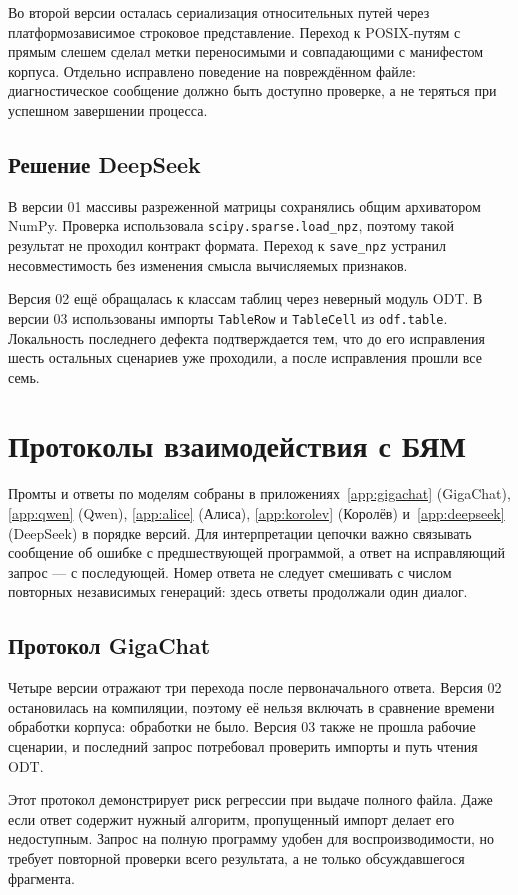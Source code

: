 Во второй версии осталась сериализация относительных путей через платформозависимое строковое представление. Переход к POSIX-путям с прямым слешем сделал метки переносимыми и совпадающими с манифестом корпуса. Отдельно исправлено поведение на повреждённом файле: диагностическое сообщение должно быть доступно проверке, а не теряться при успешном завершении процесса.

\subsection{Решение DeepSeek}
В версии 01 массивы разреженной матрицы сохранялись общим архиватором NumPy. Проверка использовала \texttt{scipy.sparse.load\_npz}, поэтому такой результат не проходил контракт формата. Переход к \texttt{save\_npz} устранил несовместимость без изменения смысла вычисляемых признаков.

Версия 02 ещё обращалась к классам таблиц через неверный модуль ODT. В версии 03 использованы импорты \texttt{TableRow} и \texttt{TableCell} из \texttt{odf.table}. Локальность последнего дефекта подтверждается тем, что до его исправления шесть остальных сценариев уже проходили, а после исправления прошли все семь.

\section{Протоколы взаимодействия с БЯМ}
Промты и ответы по моделям собраны в приложениях~\ref{app:gigachat} (GigaChat), \ref{app:qwen} (Qwen), \ref{app:alice} (Алиса), \ref{app:korolev} (Королёв) и~\ref{app:deepseek} (DeepSeek) в порядке версий. Для интерпретации цепочки важно связывать сообщение об ошибке с предшествующей программой, а ответ на исправляющий запрос — с последующей. Номер ответа не следует смешивать с числом повторных независимых генераций: здесь ответы продолжали один диалог.

\subsection{Протокол GigaChat}
Четыре версии отражают три перехода после первоначального ответа. Версия 02 остановилась на компиляции, поэтому её нельзя включать в сравнение времени обработки корпуса: обработки не было. Версия 03 также не прошла рабочие сценарии, и последний запрос потребовал проверить импорты и путь чтения ODT.

Этот протокол демонстрирует риск регрессии при выдаче полного файла. Даже если ответ содержит нужный алгоритм, пропущенный импорт делает его недоступным. Запрос на полную программу удобен для воспроизводимости, но требует повторной проверки всего результата, а не только обсуждавшегося фрагмента.

